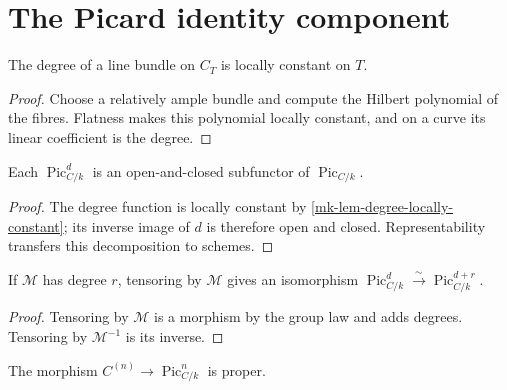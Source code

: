 \chapter{The Picard identity component}
\label{mk-ch-components}

\begin{lemma}
  \label{mk-lem-degree-locally-constant}
  \cite{kleiman-picard}
  The degree of a line bundle on \(C_T\) is locally constant on \(T\).
\end{lemma}

\begin{proof}
  Choose a relatively ample bundle and compute the Hilbert polynomial of the
  fibres.  Flatness makes this polynomial locally constant, and on a curve its
  linear coefficient is the degree.
\end{proof}

\begin{lemma}
  \label{mk-lem-degree-open-closed}
  \cite{kleiman-picard}
  Each \(\operatorname{Pic}^d_{C/k}\) is an open-and-closed subfunctor of
  \(\operatorname{Pic}_{C/k}\).
\end{lemma}

\begin{proof}
  The degree function is locally constant by
  \ref{mk-lem-degree-locally-constant}; its inverse image of \(d\) is therefore
  open and closed.  Representability transfers this decomposition to schemes.
\end{proof}

\begin{lemma}
  \label{mk-lem-picard-translation-degree}
  \cite{kleiman-picard}
  If \(\mathcal M\) has degree \(r\), tensoring by \(\mathcal M\) gives an
  isomorphism
  \(\operatorname{Pic}^d_{C/k}\xrightarrow{\sim}
    \operatorname{Pic}^{d+r}_{C/k}\).
\end{lemma}

\begin{proof}
  Tensoring by \(\mathcal M\) is a morphism by the group law and adds degrees.
  Tensoring by \(\mathcal M^{-1}\) is its inverse.
\end{proof}

\begin{lemma}
  \label{mk-lem-abel-map-proper}
  \cite{kleiman-picard}
  The morphism \(C^{(n)}\to\operatorname{Pic}^n_{C/k}\) is proper.
\end{lemma}

